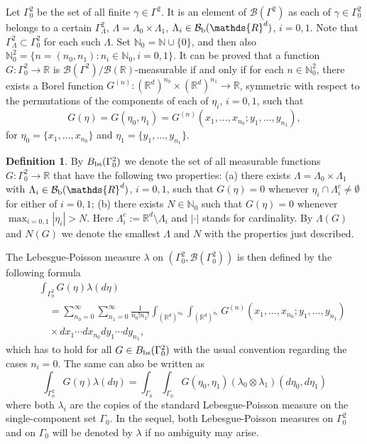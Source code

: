 \documentclass[reqno,11pt]{amsart}
\theoremstyle{definition}
\newtheorem{definition}[theorem]{Definition}
\theoremstyle{remark}
\numberwithin{equation}{section}
\begin{document}
 Let $\Gamma_0^2$ be the set of all finite $\gamma \in
\Gamma^2$. It is an element of $\mathcal{B}(\Gamma^2)$ as each of
$\gamma \in \Gamma_0^2$ belongs to a certain $\Gamma^2_\Lambda$,
$\Lambda = \Lambda_0\times \Lambda_1$, $\Lambda_{i} \in
\mathcal{B}_{\rm b}(\mathds{R}^d)$, $i=0,1$. Note that
$\Gamma^2_\Lambda \subset \Gamma^2_0$ for each such $\Lambda$. Set
$\mathds{N}_0 = \mathds{N}\cup \{0\}$, and then also $\mathds{N}_0^2
= \{n=(n_0,n_1): n_i \in \mathds{N}_0, i=0,1\}$. It can be proved
that a function $G:\Gamma^2_0 \to \mathds{R}$ is
$\mathcal{B}(\Gamma^2)/\mathcal{B}(\mathds{R} )$-measurable if and
only if for each $n\in \mathds{N}_0^2$, there exists a Borel
function $G^{(n)}: (\mathds{R}^{d})^{n_0} \times
(\mathds{R}^{d})^{n_1} \to \mathds{R}$, symmetric with respect to
the permutations of the components of each of $\eta_i$, $i=0,1$,
such that
\begin{equation*}
 
 G(\eta) = G(\eta_0, \eta_1) = G^{(n)} ( x_1, \dots , x_{n_0};  y_1, \dots , y_{n_1}),
\end{equation*}
for $\eta_0 = \{ x_1, \dots , x_{n_0}\}$ and $\eta_1 =  \{y_1, \dots
, y_{n_1}\}$.
\begin{definition}
  \label{Gdef}
By $B_{\rm bs}(\Gamma_0^2)$ we denote the set of all measurable
functions $G:\Gamma^2_0 \to \mathds{R}$ that have the following two
properties: (a) there exists $\Lambda = \Lambda_0 \times \Lambda_1$
with $\Lambda_i \in \mathcal{B}_{\rm b} (\mathds{R}^d)$, $i=0,1$,
such that $G(\eta) = 0$ whenever $\eta_i\cap \Lambda_i^c \neq
\emptyset$ for either of $i=0,1$; (b) there exists $N\in
\mathds{N}_0$ such that $G(\eta)=0$ whenever $\max_{i=0,1}|\eta_i|
>N$. Here $\Lambda_i^c := \mathds{R}^d
\setminus \Lambda_i$ and $|\cdot |$ stands for cardinality. By
$\Lambda(G)$ and $N(G)$ we denote the smallest $\Lambda$ and $N$
with the properties just described.
\end{definition}
The Lebesgue-Poisson measure $\lambda$ on $(\Gamma^2_0,
\mathcal{B}(\Gamma^2_0))$ is then defined by the following formula
\begin{eqnarray}
\label{8}
& & \int_{\Gamma_0^2} G(\eta ) \lambda ( d \eta) \\[.2cm]
& & \quad = \sum_{n_0=0}^\infty \sum_{n_1=0}^\infty \frac{1}{n_0! n_1!} \int_{(\mathds{R}^d)^{n_0}}
\int_{(\mathds{R}^d)^{n_1}} G^{(n)} ( x_1, \dots , x_{n_0};  y_1, \dots , y_{n_1}) \nonumber \\[.2cm]
& & \quad \times d x_1 \cdots dx_{n_0} d y_1 \cdots dy_{n_1}, \nonumber
\end{eqnarray}
which has to hold for all $G\in B_{\rm bs}(\Gamma_0^2)$ with the
usual convention regarding the cases $n_i=0$. The same can also be
written as
\begin{equation}
 \label{9}
\int_{\Gamma_0^2} G(\eta ) \lambda ( d \eta)  = \int_{\Gamma_0}
\int_{\Gamma_0} G(\eta_0,\eta_1 ) (\lambda_0 \otimes \lambda_1)( d
\eta_0, d \eta_1)
\end{equation}
where both $\lambda_i$ are the copies of the standard
Lebesgue-Poisson measure on the single-component set $\Gamma_0$. In
the sequel, both Lebesgue-Poisson measures on $\Gamma_0^2$ and on
$\Gamma_0$ will be denoted by $\lambda$ if no ambiguity may arise.
\end{document}
